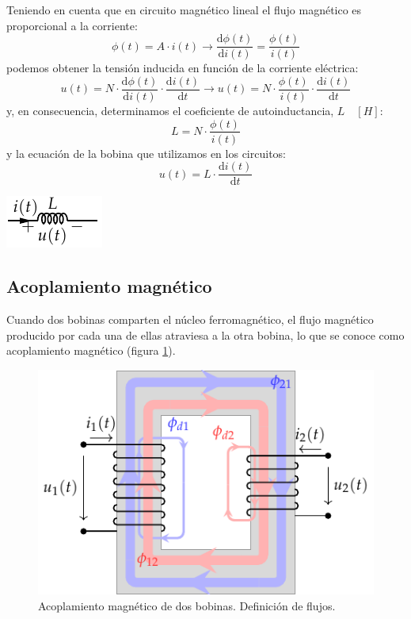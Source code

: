 Teniendo en cuenta que en circuito magnético lineal el flujo magnético es proporcional a la corriente:
\[
  \phi(t) = A \cdot i(t) \rightarrow   \frac{\mathrm{d}\phi(t)}{\mathrm{d} i(t)} = \frac{\phi(t)}{i(t)}
\]
podemos obtener la tensión inducida en función de la corriente eléctrica:
\[
u(t) = N \cdot \frac{\mathrm{d}\phi(t)}{\mathrm{d} i(t)} \cdot  \frac{\mathrm{d}i(t)}{\mathrm{d} t} \rightarrow u(t) = N \cdot \frac{\phi(t)}{i(t)} \cdot \frac{\mathrm{d}i(t)}{\mathrm{d} t}
\]
y, en consecuencia, determinamos el coeficiente de autoinductancia, $L \quad [H]$:
\[
  \boxed{L = N \cdot \frac{\phi(t)}{i(t)}}
\]
y la ecuación de la bobina que utilizamos en los circuitos:
\begin{equation}
  \label{eq:bobina-VI}
  \boxed{u(t) = L \cdot \frac{\mathrm{d}i(t)}{\mathrm{d} t}}
\end{equation}

\begin{center}
\includegraphics[height=0.1\textheight]{../figs/Bobina.pdf}
\end{center}

\subsection{Acoplamiento magnético}
\label{sec:acoplamiento}

Cuando dos bobinas comparten el núcleo ferromagnético, el flujo magnético producido por cada una de ellas atraviesa a la otra bobina, lo que se conoce como acoplamiento magnético (figura \ref{fig:acoplamiento}).

\begin{figure}
  \centering
  \includegraphics[height=0.2\textheight]{../figs/acoplamientoTikz.pdf}
    \caption{Acoplamiento magnético de dos bobinas. Definición de flujos.}
  \label{fig:acoplamiento}
\end{figure}

